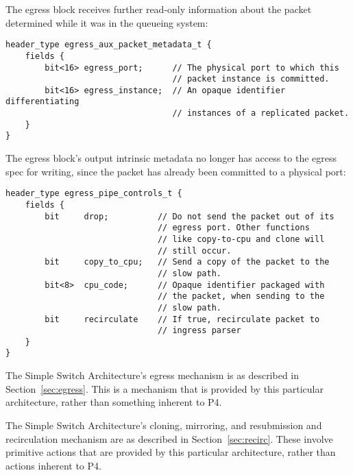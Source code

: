 \documentclass[12pt]{article}
\begin{document}
The egress block receives further read-only information about the packet
determined while it was in the queueing system:

\begin{lstlisting}[style=P4style]
header_type egress_aux_packet_metadata_t {
    fields {
        bit<16> egress_port;      // The physical port to which this
                                  // packet instance is committed.
        bit<16> egress_instance;  // An opaque identifier differentiating
                                  // instances of a replicated packet.
    }
}
\end{lstlisting}

The egress block's output intrinsic metadata no longer has access to the egress
spec for writing, since the packet has already been committed to a physical
port:

\begin{lstlisting}[style=P4style]
header_type egress_pipe_controls_t {
    fields {
        bit     drop;          // Do not send the packet out of its
                               // egress port. Other functions
                               // like copy-to-cpu and clone will
                               // still occur.
        bit     copy_to_cpu;   // Send a copy of the packet to the
                               // slow path.
        bit<8>  cpu_code;      // Opaque identifier packaged with
                               // the packet, when sending to the
                               // slow path.
        bit     recirculate    // If true, recirculate packet to
                               // ingress parser
    }
}
\end{lstlisting}


The Simple Switch Architecture's egress mechanism is as described
in Section~\ref{sec:egress}.  This is a mechanism that is provided by
this particular architecture, rather than something inherent to P4.


The Simple Switch Architecture's cloning, mirroring, and resubmission
and recirculation mechanism are as described in Section~\ref{sec:recirc}.
These involve primitive actions that are provided by this particular
architecture, rather than actions inherent to P4.
\end{document}
